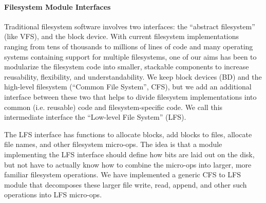 \preparagraphspacing{}
\paragraph{Filesystem Module Interfaces}
\label{sec:interfaces}

Traditional filesystem software involves two interfaces: the ``abstract
filesystem'' (like VFS), and the block device. With current filesystem
implementations ranging from tens of thousands to millions of lines of code
and many operating systems containing support for multiple filesystems, one of
our aims has been to modularize the filesystem code into smaller, stackable
components to increase reusability, flexibility, and understandability. We
keep block devices (BD) and the high-level filesystem (``Common File System'',
CFS), but we add an additional interface between these two that helps to
divide filesystem implementations into common (i.e. reusable) code and
filesystem-specific code. We call this intermediate interface the ``Low-level
File System'' (LFS).

The LFS interface has functions to allocate blocks, add blocks to files,
allocate file names, and other filesystem micro-ops. The idea is that a module
implementing the LFS interface should define how bits are laid out on the
disk, but not have to actually know how to combine the micro-ops into larger,
more familiar filesystem operations. We have implemented a generic CFS to LFS
module that decomposes these larger file write, read, append, and other such
operations into LFS micro-ops.
